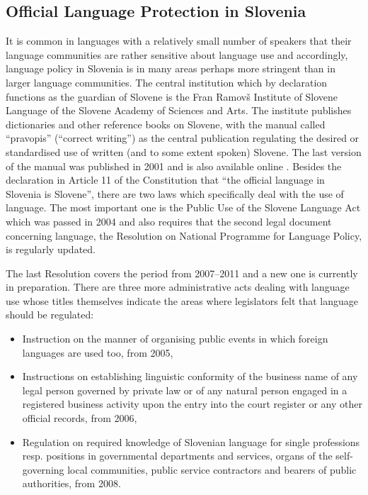 \begin{multicols}{2}
\subsection{Official Language Protection in Slovenia}

It is common in languages with a relatively small number of speakers that their language communities are rather sensitive about language use and accordingly, language policy in Slovenia is in many areas perhaps more stringent than in larger language communities. The central institution which by declaration functions as the guardian of Slovene is the Fran Ramovš Institute of Slovene Language of the Slovene Academy of Sciences and Arts. The institute publishes dictionaries and other reference books on Slovene, with the manual called ``pravopis'' (``correct writing'') as the central publication regulating the desired or standardised use of written (and to some extent spoken) Slovene. The last version of the manual was published in 2001 and is also available online \cite{ISJFR1}. 
Besides the declaration in Article 11 of the Constitution that ``the official language in Slovenia is Slovene'', there are two laws which specifically deal with the use of language. The most important one is the Public Use of the Slovene Language Act which was passed in 2004 and also requires that the second legal document concerning language, the Resolution on National Programme for Language Policy, is regularly updated.


The last Resolution covers the period from 2007--2011 and a new one is currently in preparation. There are three more administrative acts dealing with language use whose titles themselves indicate the areas where legislators felt that language should be regulated: 

\begin{itemize}
\item Instruction on the manner of organising public events in which foreign languages are used too, from 2005,
\item Instructions on establishing linguistic conformity of the business name of any legal person governed by private law or of any natural person engaged in a registered business activity upon the entry into the court register or any other official records, from 2006,
\item Regulation on required knowledge of Slovenian language for single professions resp. positions in governmental departments and services, organs of the self-governing local communities, public service contractors and bearers of public authorities, from 2008.
\end{itemize}  


\end{multicols}
